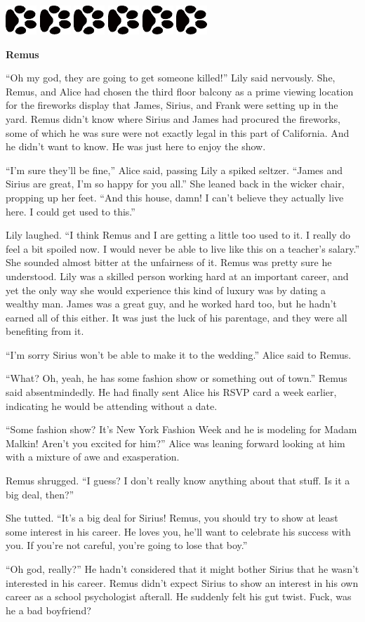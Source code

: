 \documentclass[12pt,twoside,openright]{memoir}
\newcommand{\myrulez}{	
	\begin{center}
		\hspace{.5em}
		\includegraphics[angle=60]{dogprint.pdf}
		\hspace{.5em}
		\includegraphics[angle=120]{dogprint.pdf}
		\hspace{.5em}
		\includegraphics[angle=60]{dogprint.pdf}
		\hspace{.5em}
		\includegraphics[angle=120]{dogprint.pdf}
		\hspace{.5em}
		\includegraphics[angle=60]{dogprint.pdf}
		\hspace{.5em}
		\includegraphics[angle=120]{dogprint.pdf}
		\hspace{.5em}
	\end{center}
}
\begin{document}
\myrulez

\textbf{Remus} 

``Oh my god, they are going to get someone killed!'' Lily said nervously. She, Remus, and Alice had chosen the third floor balcony as a prime viewing location for the fireworks display that James, Sirius, and Frank were setting up in the yard. Remus didn't know where Sirius and James had procured the fireworks, some of which he was sure were not exactly legal in this part of California. And he didn't want to know. He was just here to enjoy the show. 

``I'm sure they'll be fine,'' Alice said, passing Lily a spiked seltzer. ``James and Sirius are great, I'm so happy for you all.'' She leaned back in the wicker chair, propping up her feet. ``And this house, damn! I can't believe they actually live here. I could get used to this.''

Lily laughed. ``I think Remus and I are getting a little too used to it. I really do feel a bit spoiled now. I would never be able to live like this on a teacher's salary.'' She sounded almost bitter at the unfairness of it. Remus was pretty sure he understood. Lily was a skilled person working hard at an important career, and yet the only way she would experience this kind of luxury was by dating a wealthy man. James was a great guy, and he worked hard too, but he hadn't earned all of this either. It was just the luck of his parentage, and they were all benefiting from it.

``I'm sorry Sirius won't be able to make it to the wedding.'' Alice said to Remus. 

``What? Oh, yeah, he has some fashion show or something out of town.'' Remus said absentmindedly. He had finally sent Alice his RSVP card a week earlier, indicating he would be attending without a date. 

``Some fashion show? It's New York Fashion Week and he is modeling for Madam Malkin! Aren't you excited for him?'' Alice was leaning forward looking at him with a mixture of awe and exasperation.

Remus shrugged. ``I guess? I don't really know anything about that stuff. Is it a big deal, then?''

She tutted. ``It's a big deal for Sirius! Remus, you should try to show at least some interest in his career. He loves you, he'll want to celebrate his success with you. If you're not careful, you're going to lose that boy.''

``Oh god, really?'' He hadn't considered that it might bother Sirius that he wasn't interested in his career. Remus didn't expect Sirius to show an interest in his own career as a school psychologist afterall. He suddenly felt his gut twist. Fuck, was he a bad boyfriend?
\end{document}
